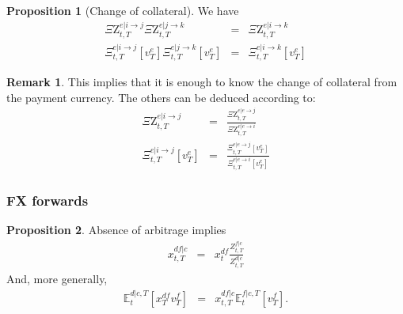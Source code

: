 \documentclass[11pt,english]{amsart}
\newcommand{\EE}{\mathbb{E}}
\newcommand{\Q}{\Xi}
\newcommand{\QZ}{{\Xi\mathrm{Z}}}
\theoremstyle{definition}
\newtheorem{prop}{Proposition}
\newtheorem{rema}{Remark}
\begin{document}
\begin{prop}[Change of collateral]
We have
\begin{eqnarray}
  \QZ^{e|i\to j}_{t,T} \QZ^{e|j\to k}_{t,T} &=& \QZ^{e|i\to k}_{t,T} \\
  \Q^{e|i\to j}_{t,T}[v^e_T] \Q^{e|j\to k}_{t,T}[v^e_T]  &=& \Q^{e|i\to k}_{t,T}[v^e_T]
\end{eqnarray}
\end{prop}

\begin{rema}
This implies that it is enough to know the change of collateral from the payment currency. The others can be deduced according to: 
\begin{eqnarray}
  \QZ^{e|i\to j}_{t,T} &=& \frac{\QZ^{e|e\to j}_{t,T}}{\QZ^{e|e\to i}_{t,T}} \\
  \Q^{e|i\to j}_{t,T}[v^e_T] &=& \frac{\Q^{e|e\to j}_{t,T}[v^e_T]}{\Q^{e|e\to i}_{t,T}[v^e_T]}
\end{eqnarray}
\end{rema}

\subsubsection{FX forwards}

\begin{prop}
Absence of arbitrage implies 
\begin{eqnarray}
   x^{df|c}_{t,T} &=& x^{df}_{t} \frac{Z^{f|c}_{t,T}}{Z^{d|c}_{t,T}}
\end{eqnarray}
And, more generally, 
\begin{eqnarray}
   \EE^{d|c,T}_t\left[ x^{df}_{T}v^{f}_T\right]  &=&  x^{df|c}_{t,T} \EE^{f|c,T}_t\left[ v^{f}_T\right] .
\end{eqnarray}
\end{prop}


\end{document}
